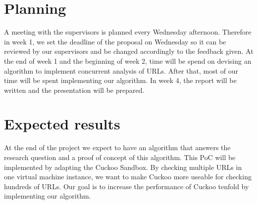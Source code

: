 \documentclass{scrartcl}
\begin{document}



\section{Planning}

A meeting with the supervisors is planned every Wednesday afternoon. Therefore in week 1, we set the deadline of the proposal on Wednesday so it can be reviewed by our supervisors and be changed accordingly to the feedback given. At the end of week 1 and the beginning of week 2, time will be spend on devising an algorithm to implement concurrent analysis of URLs. After that, most of our time will be spent implementing our algorithm. In week 4, the report will be written and the presentation will be prepared.

\section{Expected results}

At the end of the project we expect to have an algorithm that answers the research question and a proof of concept of this algorithm. This PoC will be implemented by adapting the Cuckoo Sandbox. By checking multiple URLs in one virtual machine instance, we want to make Cuckoo more useable for checking hundreds of URLs. Our goal is to increase the performance of Cuckoo tenfold by implementing our algorithm.
\end{document}
